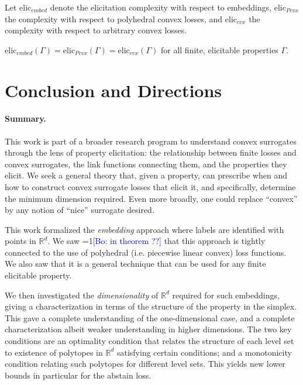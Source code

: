 \documentclass[anon,12pt]{colt2019}
\newcommand{\Comments}{1}
\newcommand{\mynote}[2]{\ifnum\Comments=1\textcolor{#1}{#2}\fi}
\newcommand{\bo}[1]{\mynote{blue}{[Bo: #1]}}
\newcommand{\reals}{\mathbb{R}}
\begin{document}
Let $\mathrm{elic}_{embed}$ denote the elicitation complexity with respect to embeddings, $\mathrm{elic}_{Pcvx}$ the complexity with respect to polyhedral convex losses, and $\mathrm{elic}_{cvx}$ the complexity with respect to arbitrary convex losses.

\begin{conjecture}
  $\mathrm{elic}_{embed}(\Gamma) = \mathrm{elic}_{Pcvx}(\Gamma) = \mathrm{elic}_{cvx}(\Gamma)$ for all finite, elicitable properties $\Gamma$.
\end{conjecture}


\section{Conclusion and Directions}  \label{sec:conclusion}
\paragraph{Summary.}
This work is part of a broader research program to understand convex surrogates through the lens of property elicitation: the relationship between finite losses and convex surrogates, the link functions connecting them, and the properties they elicit.
We seek a general theory that, given a property, can prescribe when and how to construct convex surrogate losses that elicit it, and specifically, determine the minimum dimension required.
Even more broadly, one could replace ``convex'' by any notion of ``nice'' surrogate desired.

This work formalized the \emph{embedding} approach where labels are identified with points in $\reals^d$.
We saw \bo{in theorem ??} that this approach is tightly connected to the use of polyhedral (i.e. piecewise linear convex) loss functions.
We also saw that it is a general technique that can be used for any finite elicitable property.

We then investigated the \emph{dimensionality} of $\reals^d$ required for such embeddings, giving a characterization in terms of the structure of the property in the simplex.
This gave a complete understanding of the one-dimensional case, and a complete characterization albeit weaker understanding in higher dimensions.
The two key conditions are an optimality condition that relates the structure of each level set to existence of polytopes in $\reals^d$ satisfying certain conditions; and a monotonicity condition relating such polytopes for different level sets.
This yields new lower bounds in particular for the abstain loss.
\end{document}
